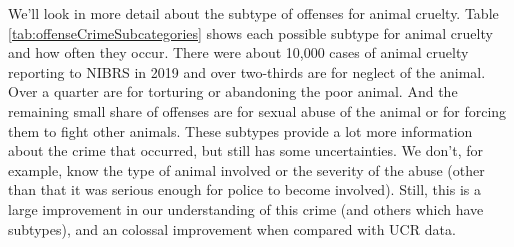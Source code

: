 \documentclass[
  12pt,
  openany]{book}
\begin{document}
We'll look in more detail about the subtype of offenses for animal cruelty. Table \ref{tab:offenseCrimeSubcategories} shows each possible subtype for animal cruelty and how often they occur. There were about 10,000 cases of animal cruelty reporting to NIBRS in 2019 and over two-thirds are for neglect of the animal. Over a quarter are for torturing or abandoning the poor animal. And the remaining small share of offenses are for sexual abuse of the animal or for forcing them to fight other animals. These subtypes provide a lot more information about the crime that occurred, but still has some uncertainties. We don't, for example, know the type of animal involved or the severity of the abuse (other than that it was serious enough for police to become involved). Still, this is a large improvement in our understanding of this crime (and others which have subtypes), and an colossal improvement when compared with UCR data.
\end{document}

